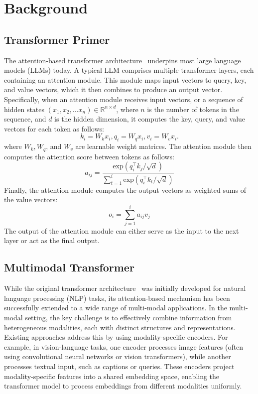 \section{Background}

\subsection{Transformer Primer}
The attention-based transformer architecture~\cite{vaswani:attention} underpins most 
large language models (LLMs) today. 
A typical LLM comprises multiple transformer layers, each containing an attention module. 
This module maps input vectors to query, key, and value vectors, 
which it then combines to produce an output vector.
%
Specifically, when an attention module receives input vectors, or a sequence of hidden states 
$(x_1,x_2,...x_n)\in \mathbb{R}^{n \times d}$, where $n$ is the number of tokens in the sequence, 
and $d$ is the hidden dimension, it computes the key, query, and value vectors for each token as follows: 
$$k_i=W_kx_i, q_i=W_qx_i, v_i=W_vx_i.$$
%
where $W_k, W_q$, and $W_v$ are learnable weight matrices.  
%
The attention module then computes the attention score between tokens as follows:
%
$$a_{ij}=\frac{\text{exp}(q_i^{\top}k_j/\sqrt{d})}{\sum_{t=1}^{i}\text{exp}(q_i^{\top}k_t/\sqrt{d})}$$
%
Finally, the attention module computes the output vectors as weighted sums of the value vectors: 
$$o_i=\sum_{j=1}^{i}a_{ij}v_{j}$$
The output of the attention module can either serve as the input to the next layer or act as the final output.
\subsection{Multimodal Transformer}
While the original transformer architecture~\cite{vaswani:attention} was initially developed for natural language processing (NLP) tasks, its attention-based mechanism has been successfully extended to a wide range of multi-modal applications. In the multi-modal setting, the key challenge is to effectively combine information from heterogeneous modalities, each with distinct structures and representations. Existing approaches address this by using modality-specific encoders. For example, in vision-language tasks, one encoder processes image features (often using convolutional neural networks or vision transformers), while another processes textual input, such as captions or queries. These encoders project modality-specific features into a shared embedding space, enabling the transformer model to process embeddings from different modalities uniformly.

